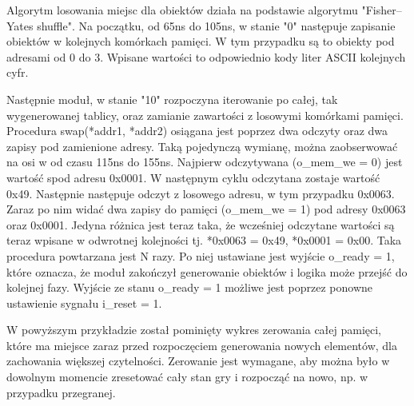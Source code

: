 \documentclass[polish,polish,a4paper]{article}
\begin{document}
Algorytm losowania miejsc dla obiektów działa na podstawie algorytmu "Fisher–Yates shuffle".
Na początku, od 65ns do 105ns, w stanie "0" następuje zapisanie obiektów w kolejnych komórkach pamięci.
W tym przypadku są to obiekty pod adresami od 0 do 3. Wpisane wartości to odpowiednio
kody liter ASCII kolejnych cyfr.

Następnie moduł, w stanie "10" rozpoczyna iterowanie po całej, tak wygenerowanej tablicy, oraz
zamianie zawartości z losowymi komórkami pamięci.
Procedura swap(*addr1, *addr2) osiągana jest poprzez dwa odczyty oraz dwa zapisy pod zamienione adresy.
Taką pojedynczą wymianę, można zaobserwować na osi w od czasu 115ns do 155ns.
Najpierw odczytywana (o\_mem\_we = 0) jest wartość spod adresu 0x0001.
W następnym cyklu odczytana zostaje wartość 0x49.
Następnie następuje odczyt z losowego adresu, w tym przypadku 0x0063.
Zaraz po nim widać dwa zapisy do pamięci (o\_mem\_we = 1) pod adresy 0x0063 oraz 0x0001.
Jedyna różnica jest teraz taka, że wcześniej odczytane wartości są teraz wpisane w odwrotnej kolejności
tj. *0x0063 = 0x49, *0x0001 = 0x00.
Taka procedura powtarzana jest N razy.
Po niej ustawiane jest wyjście o\_ready = 1, które oznacza, że moduł zakończył generowanie obiektów
i logika może przejść do kolejnej fazy. Wyjście ze stanu o\_ready = 1 możliwe jest poprzez ponowne ustawienie
sygnału i\_reset = 1.

W powyższym przykładzie został pominięty wykres zerowania całej pamięci, które ma miejsce zaraz przed
rozpoczęciem generowania nowych elementów, dla zachowania większej czytelności.
Zerowanie jest wymagane, aby można było w dowolnym momencie zresetować cały stan gry i rozpocząć na nowo,
np. w przypadku przegranej.
\end{document}

